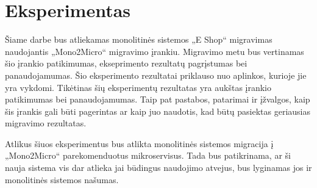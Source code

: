 \documentclass{VUMIFPSbakalaurinis}
\begin{document}

\section{Eksperimentas}
Šiame darbe bus atliekamas monolitinės sistemos „E Shop“ migravimas naudojantis „Mono2Micro“ migravimo įrankiu. Migravimo metu bus vertinamas šio įrankio patikimumas, ekseprimento rezultatų pagrįstumas bei panaudojamumas. Šio eksperimento rezultatai priklauso nuo aplinkos, kurioje jie yra vykdomi. Tikėtinas šių eksperimentų rezultatas yra aukštas įrankio patikimumas bei panaudojamumas. Taip pat pastabos, patarimai ir įžvalgos, kaip šis įrankis gali būti pagerintas ar kaip juo naudotis, kad būtų pasiektas geriausias migravimo rezultatas.

Atlikus šiuos eksperimentus bus atlikta monolitinės sistemos migracija į „Mono2Micro“ parekomenduotus mikroservisus. Tada bus patikrinama, ar ši nauja sistema vis dar atlieka jai būdingus naudojimo atvejus, bus lyginamas jos ir monolitinės sistemos našumas.



\end{document}
